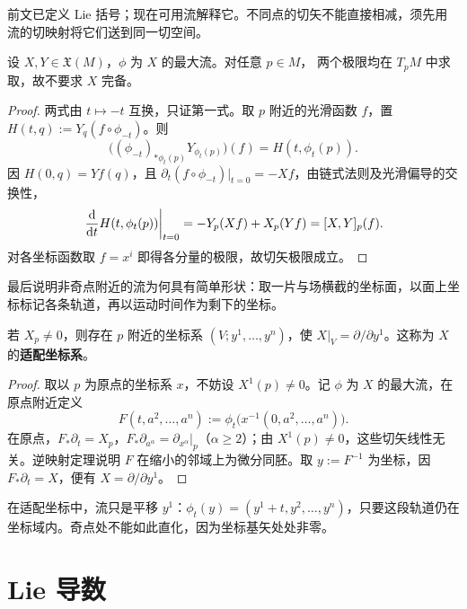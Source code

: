 前文已定义 Lie 括号；现在可用流解释它。不同点的切矢不能直接相减，须先用流的切映射将它们送到同一切空间。
\begin{theorem}\label{chdm:thm_xy-yx}
    设 $X,Y\in\mathfrak X(M)$，$\phi$ 为 $X$ 的最大流。对任意 $p\in M$，
    两个极限均在 $T_pM$ 中求取，故不要求 $X$ 完备。
\end{theorem}
\begin{proof}
    两式由 $t\mapsto-t$ 互换，只证第一式。取 $p$ 附近的光滑函数 $f$，置 $H(t,q):=Y_q(f\circ\phi_{-t})$。则
    \[
        \bigl((\phi_{-t})_{*\phi_t(p)}Y_{\phi_t(p)}\bigr)(f)
        =H(t,\phi_t(p)).
    \]
    因 $H(0,q)=Yf(q)$，且 $\partial_t(f\circ\phi_{-t})|_{t=0}=-Xf$，由链式法则及光滑偏导的交换性，
    \[
        \left.\frac{\dd}{\dd t}H(t,\phi_t(p))\right|_{t=0}
        =-Y_p(Xf)+X_p(Yf)=[X,Y]_p(f).
    \]
    对各坐标函数取 $f=x^i$ 即得各分量的极限，故切矢极限成立。
\end{proof}

最后说明非奇点附近的流为何具有简单形状：取一片与场横截的坐标面，以面上坐标标记各条轨道，再以运动时间作为剩下的坐标。
\begin{theorem}[矢量场直化定理]
    若 $X_p\ne0$，则存在 $p$ 附近的坐标系 $(V;y^1,\ldots,y^n)$，使 $X|_V=\partial/\partial y^1$。这称为 $X$ 的\textbf{适配坐标系}。
\end{theorem}
\begin{proof}
    取以 $p$ 为原点的坐标系 $x$，不妨设 $X^1(p)\ne0$。记 $\phi$ 为 $X$ 的最大流，在原点附近定义
    \[
        F(t,a^2,\ldots,a^n):=\phi_t\bigl(x^{-1}(0,a^2,\ldots,a^n)\bigr).
    \]
    在原点，$F_*\partial_t=X_p$，$F_*\partial_{a^\alpha}=\partial_{x^\alpha}|_p$（$\alpha\geqslant2$）；由 $X^1(p)\ne0$，这些切矢线性无关。逆映射定理说明 $F$ 在缩小的邻域上为微分同胚。取 $y:=F^{-1}$ 为坐标，因 $F_*\partial_t=X$，便有 $X=\partial/\partial y^1$。
\end{proof}

在适配坐标中，流只是平移 $y^1$：$\phi_t(y)=(y^1+t,y^2,\ldots,y^n)$，只要这段轨道仍在坐标域内。奇点处不能如此直化，因为坐标基矢处处非零。


\section{Lie 导数}\label{appx:Lie-deri}

